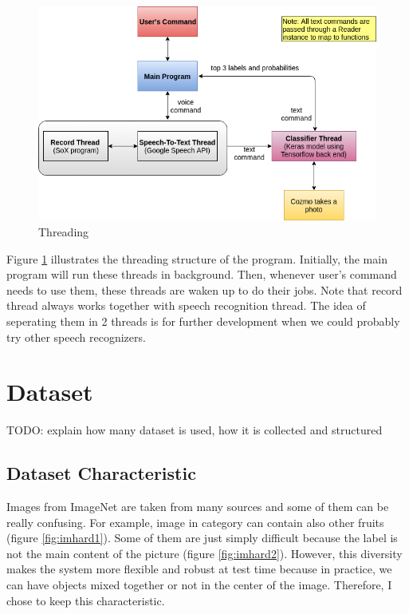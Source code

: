 \begin{figure}[!htb]
	\centering
	\includegraphics[width=0.9\hsize]{./figures/threads}
	\caption{Threading}
	\label{fig:threads}
\end{figure}

Figure \ref{fig:threads} illustrates the threading structure of the program. Initially, the main program will run these threads in background. Then, whenever user's command needs to use them, these threads are waken up to do their jobs. Note that record thread always works together with speech recognition thread. The idea of seperating them in 2 threads is for further development when we could probably try other speech recognizers.

\section{Dataset}
TODO: explain how many dataset is used, how it is collected and structured

\subsection{Dataset Characteristic}
Images from ImageNet are taken from many sources and some of them can be really confusing. For example, image in category  can contain also other fruits (figure \ref{fig:imhard1}). Some of them are just simply difficult because the label is not the main content of the picture (figure \ref{fig:imhard2}). However, this diversity makes the system more flexible and robust at test time because in practice, we can have objects mixed together or not in the center of the image. Therefore, I chose to keep this characteristic.

